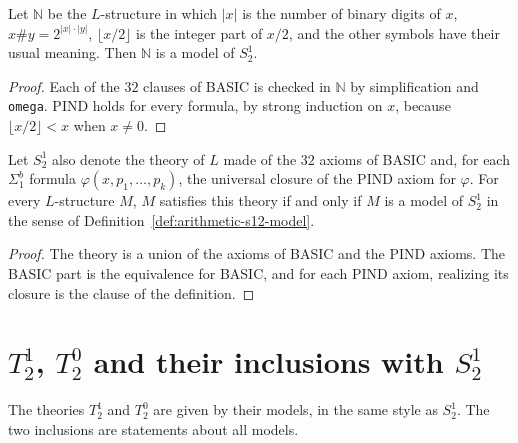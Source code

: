 \begin{theorem}
  \label{thm:arithmetic-nat-s12}
  \leanok
  Let $\mathbb{N}$ be the $L$-structure in which $|x|$ is the number of binary digits of $x$, $x \#
  y = 2^{|x| \cdot |y|}$, $\lfloor x/2 \rfloor$ is the integer part of $x/2$, and the other symbols
  have their usual meaning. Then $\mathbb{N}$ is a model of $S^1_2$.
\end{theorem}

\begin{proof}
  \leanok
  Each of the $32$ clauses of BASIC is checked in $\mathbb{N}$ by simplification and \texttt{omega}.
  PIND holds for every formula, by strong induction on $x$, because $\lfloor x/2 \rfloor < x$ when $x
  \ne 0$.
\end{proof}

\begin{theorem}
  \label{thm:arithmetic-s12-theory}
  \leanok
  Let $S^1_2$ also denote the theory of $L$ made of the $32$ axioms of BASIC and, for each
  $\Sigma^b_1$ formula $\varphi(x, p_1, \dots, p_k)$, the universal closure of the PIND axiom for
  $\varphi$. For every $L$-structure $M$, $M$ satisfies this theory if and only if $M$ is a model of
  $S^1_2$ in the sense of Definition~\ref{def:arithmetic-s12-model}.
\end{theorem}

\begin{proof}
  \leanok
  The theory is a union of the axioms of BASIC and the PIND axioms. The BASIC part is the
  equivalence for BASIC, and for each PIND axiom, realizing its closure is the clause of the
  definition.
\end{proof}

\section{$T^1_2$, $T^0_2$ and their inclusions with $S^1_2$}
\label{sec:arithmetic-t12}

The theories $T^1_2$ and $T^0_2$ are given by their models, in the same style as $S^1_2$. The two
inclusions are statements about all models.

